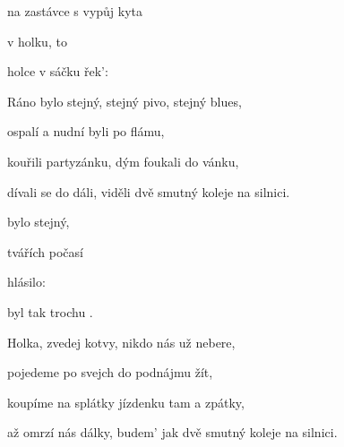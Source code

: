 

\zs
{} na zastávce s vypůj kyta

v  holku, to  

 holce v sáčku řek': 
\ks

\zs
Ráno bylo stejný, stejný pivo, stejný blues,

ospalí a nudní byli po flámu,

kouřili partyzánku, dým foukali do vánku,

dívali se do dáli, viděli dvě smutný koleje na silnici.
\ks

\zr
{} bylo stejný,   

 tvářích počasí   

 hlásilo: 

 byl tak trochu  .
\kr

\zs
Holka, zvedej kotvy, nikdo nás už nebere,

pojedeme po svejch do podnájmu žít,

koupíme na splátky jízdenku tam a zpátky,

až omrzí nás dálky, budem' jak dvě smutný koleje na silnici.
\ks

\zr	\kr

\kp






















